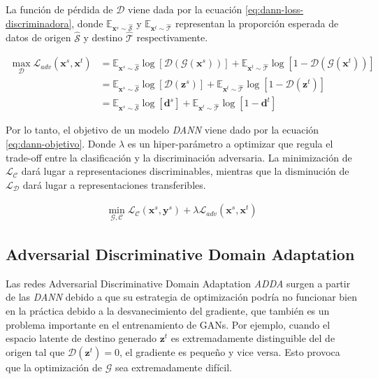 La funci\'on de p\'erdida de $\mathcal{D}$ viene dada por la ecuaci\'on \ref{eq:dann-loss-discriminadora}, donde
$\mathbb{E}_{\mathbf{x}^s \sim \mathcal{\hat{S}}}$ y $\mathbb{E}_{\mathbf{x}^t \sim \mathcal{\hat{T}}}$ representan la
proporci\'on esperada de datos de origen $\mathcal{\hat{S}}$ y destino $\mathcal{\hat{T}}$ respectivamente.

\begin{align}
    \max_{\mathcal{D}} \mathcal{L}_{adv}(\mathbf{x}^s, \mathbf{x}^t) & = \mathbb{E}_{\mathbf{x}^s \sim \mathcal{\hat{S}}}\log[\mathcal{D}(\mathcal{G}(\mathbf{x}^s))] + \mathbb{E}_{\mathbf{x}^t \sim \mathcal{\hat{T}}}\log[1-\mathcal{D}(\mathcal{G}(\mathbf{x}^t))] \nonumber \\
                                                                     & = \mathbb{E}_{\mathbf{x}^s \sim \mathcal{\hat{S}}}\log[\mathcal{D}(\mathbf{z}^s)] + \mathbb{E}_{\mathbf{x}^t \sim \mathcal{\hat{T}}}\log[1-\mathcal{D}(\mathbf{z}^t)] \nonumber                           \\
                                                                     & = \mathbb{E}_{\mathbf{x}^s \sim \mathcal{\hat{S}}}\log[\mathbf{d}^s] + \mathbb{E}_{\mathbf{x}^t \sim \mathcal{\hat{T}}}\log[1-\mathbf{d}^t]
    \label{eq:dann-loss-discriminadora}
\end{align}

Por lo tanto, el objetivo de un modelo {\it DANN} viene dado por la ecuaci\'on \ref{eq:dann-objetivo}. Donde $\lambda$
es un hiper-par\'ametro a optimizar que regula el trade-off entre la clasificaci\'on y la discriminaci\'on adversaria.
La minimización de $\mathcal{L}_\mathcal{C}$ dará lugar a representaciones discriminables, mientras que la disminución
de $\mathcal{L}_\mathcal{D}$ dará lugar a representaciones transferibles.

\begin{align}
    \min_{\mathcal{G},\mathcal{C}} \mathcal{L}_\mathcal{C}(\mathbf{x}^s, \mathbf{y}^s) + \lambda \mathcal{L}_{adv}(\mathbf{x}^s, \mathbf{x}^t)
    \label{eq:dann-objetivo}
\end{align}

\subsection{Adversarial Discriminative Domain Adaptation}
Las redes Adversarial Discriminative Domain Adaptation {\it ADDA} \parencite{tzeng2017adversarial} surgen a partir de las {\it DANN} debido a que su estrategia de optimización podría no
funcionar bien en la práctica debido a la desvanecimiento del gradiente, que también es un problema importante en el
entrenamiento de GANs. Por ejemplo, cuando el espacio latente de destino generado $\mathbf{z}^t$ es extremadamente
distinguible del de origen tal que $\mathcal{D}(\mathbf{z}^t)=0$, el gradiente es peque\~{n}o y vice versa. Esto
provoca que la optimizaci\'on de $\mathcal{G}$ sea extremadamente dif\'icil.

